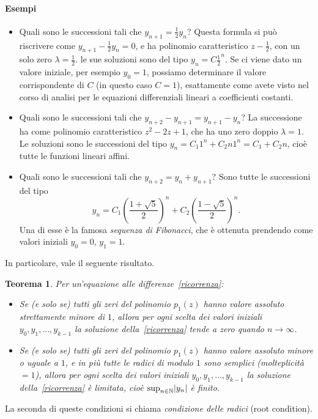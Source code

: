 \documentclass[a4paper]{report}
\DeclarePairedDelimiter{\abs}{\lvert}{\rvert}
\newtheorem{theorem}{Teorema}[chapter]
\theoremstyle{definiton}
\theoremstyle{remark}
\begin{document}
\paragraph{Esempi}
\begin{itemize}
    \item Quali sono le successioni tali che $y_{n+1} = \frac{1}{2}y_n$? Questa formula si può riscrivere come $y_{n+1}-\frac{1}{2}y_n=0$, e ha polinomio caratteristico $z-\frac{1}{2}$, con un solo zero $\lambda=\frac{1}{2}$. le sue soluzioni sono del tipo $y_n = C \frac{1}{2}^n$. Se ci viene dato un valore iniziale, per esempio $y_0=1$, possiamo determinare il valore corrispondente di $C$ (in questo caso $C=1$), esattamente come avete visto nel corso di analisi per le equazioni differenziali lineari a coefficienti costanti.
    \item Quali sono le successioni tali che $y_{n+2} - y_{n+1} = y_{n+1}-y_n$? La successione ha come polinomio caratteristico $z^2-2z+1$, che ha uno zero doppio $\lambda=1$. Le soluzioni sono le successioni del tipo $y_n = C_1 1^n + C_2 n 1^n = C_1 + C_2 n$, cioè tutte le funzioni lineari affini.
    \item Quali sono le successioni tali che $y_{n+2} = y_n + y_{n+1}$? Sono tutte le successioni del tipo
    \[
        y_n = C_1 \left(\frac{1+\sqrt{5}}{2}\right)^n + C_2 \left(\frac{1-\sqrt{5}}{2}\right)^n.
    \]
    Una di esse è la famosa \emph{sequenza di Fibonacci}, che è ottenuta prendendo come valori iniziali $y_0 = 0$, $y_1=1$.
\end{itemize}
In particolare, vale il seguente risultato.
\begin{theorem} \label{thm:eq-differenze} Per un'equazione alle differenze~\eqref{ricorrenza}:
\begin{itemize}
    \item Se (e solo se) tutti gli zeri del polinomio $p_1(z)$ hanno valore assoluto strettamente minore di $1$, allora per ogni scelta dei valori iniziali $y_0, y_1,\dots, y_{k-1}$ la soluzione della~\eqref{ricorrenza} tende a zero quando $n\to\infty$.
    \item Se (e solo se) tutti gli zeri del polinomio $p_1(z)$ hanno valore assoluto minore o uguale a $1$, e in più tutte le radici di modulo $1$ sono semplici (molteplicità $=1$), allora per ogni scelta dei valori iniziali $y_0, y_1,\dots, y_{k-1}$ la soluzione della~\eqref{ricorrenza} è limitata, cioè $\sup_{n\in\mathbb{N}} \abs{y_n}$ è finito.
\end{itemize}
\end{theorem}
La seconda di queste condizioni si chiama \emph{condizione delle radici} (root condition).
\end{document}
